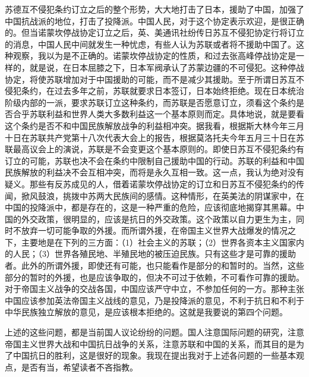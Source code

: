 苏德互不侵犯条约订立之后的整个形势，大大地打击了日本，援助了中国，加强了中国抗战派的地位，打击了投降派。中国人民，对于这个协定表示欢迎，是很正确的。但当诺蒙坎停战协定订立之后，英、美通讯社纷传日苏互不侵犯协定行将订立的消息，中国人民中间就发生一种忧虑，有些人认为苏联或者将不援助中国了。这种观察，我以为是不正确的。诺蒙坎停战协定的性质，和过去张高峰停战协定是一样的，就是说，在日本屈膝之下，日本军阀承认了苏蒙边疆的不可侵犯。这种停战协定，将使苏联增加对于中国援助的可能，而不是减少其援助。至于所谓日苏互不侵犯条约，在过去多年之前，苏联就要求日本签订，日本始终拒绝。现在日本统治阶级内部的一派，要求苏联订立这种条约，而苏联是否愿意订立，须看这个条约是否合乎苏联利益和世界人类大多数利益这一个基本原则而定。具体地说，就是要看这个条约是否不和中国民族解放战争的利益相冲突。据我看，根据斯大林今年三月十日在苏联共产党第十八次代表大会上的报告，根据莫洛托夫今年五月三十日在苏联最高议会上的演说，苏联是不会变更这个基本原则的。即使日苏互不侵犯条约有订立的可能，苏联也决不会在条约中限制自己援助中国的行动。苏联的利益和中国民族解放的利益决不会互相冲突，而将是永久互相一致。这一点，我认为绝对没有疑义。那些有反苏成见的人，借着诺蒙坎停战协定的订立和日苏互不侵犯条约的传闻，掀风鼓浪，挑拨中苏两大民族间的感情。这种情形，在英美法的阴谋家中，在中国的投降派中，都是存在的，这是一种严重的危险，应该彻底地揭穿其黑幕。中国的外交政策，很明显的，应该是抗日的外交政策。这个政策以自力更生为主，同时不放弃一切可能争取的外援。而所谓外援，在帝国主义世界大战爆发的情况之下，主要地是在下列的三方面：（1）社会主义的苏联；（2）世界各资本主义国家内的人民；（3）世界各殖民地、半殖民地的被压迫民族。只有这些才是可靠的援助者。此外的所谓外援，即使还有可能，也只能看作是部分的和暂时的。当然，这些部分的暂时的外援，也是应该争取的，但决不可过于依赖，不可看作可靠的援助。对于帝国主义战争的交战各国，中国应该严守中立，不参加任何的一方。那种主张中国应该参加英法帝国主义战线的意见，乃是投降派的意见，不利于抗日和不利于中华民族独立解放的意见，是应该根本拒绝的。这就是我要说的第四个问题。

上述的这些问题，都是当前国人议论纷纷的问题。国人注意国际问题的研究，注意帝国主义世界大战和中国抗日战争的关系，注意苏联和中国的关系，而其目的是为了中国抗日的胜利，这是很好的现象。我现在提出我对于上述各问题的一些基本观点，是否有当，希望读者不吝指教。


